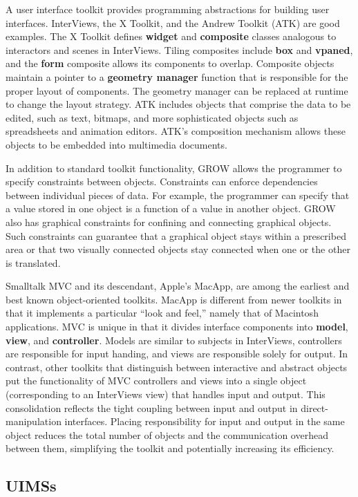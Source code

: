 A user interface toolkit provides programming abstractions for
building user interfaces.  InterViews, the X Toolkit,
and the Andrew
Toolkit (ATK) are good examples.  The X Toolkit defines
{\bf widget} and {\bf composite} classes analogous to interactors and
scenes in InterViews.  Tiling composites include {\bf box} and {\bf
vpaned}, and the {\bf form} composite allows its components to
overlap.  Composite objects maintain a pointer to a {\bf geometry
manager} function that is responsible for the proper layout of
components.  The geometry manager can be replaced at runtime to change
the layout strategy.  ATK includes objects that comprise the
data to be edited, such as text, bitmaps, and more sophisticated
objects such as spreadsheets and animation editors.  ATK's composition
mechanism allows these objects to be embedded into
multimedia documents.

In addition to standard toolkit functionality, GROW allows
the programmer to specify constraints between objects.  Constraints
can enforce dependencies between individual pieces of data.  For
example, the programmer can specify that a value stored in one object
is a function of a value in another object.  GROW also has graphical
constraints for confining and connecting graphical
objects.  Such constraints can guarantee that a graphical
object stays within a prescribed area or that two visually connected
objects stay connected when one or the other is translated.

Smalltalk MVC and its descendant, Apple's MacApp,
are among the earliest
and best known object-oriented toolkits.  MacApp is different
from newer toolkits in that it implements a particular ``look and
feel,'' namely that of Macintosh applications.  MVC is unique in that
it divides interface components into {\bf model}, {\bf view}, and {\bf
controller}. Models are similar to subjects in InterViews,
controllers are responsible for input handing, and views are
responsible solely for output.  In contrast, other toolkits that
distinguish between interactive and abstract objects put the
functionality of MVC controllers and views into a single object
(corresponding to an InterViews view) that handles input and output.
This consolidation reflects the tight coupling between input and output
in direct-manipulation interfaces.  Placing responsibility for
input and output in the same object reduces the total number of
objects and the communication overhead between them, simplifying the
toolkit and potentially increasing its efficiency.

\subsection*{UIMSs}

